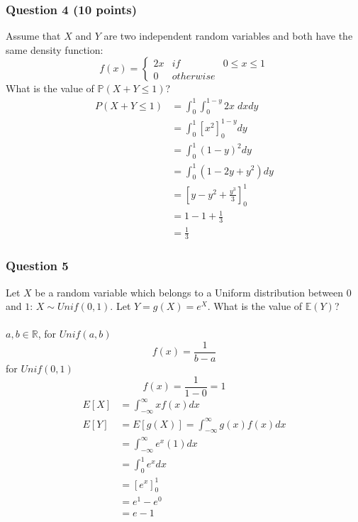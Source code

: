 \documentclass[12pt, border = 4pt, multi]{article} %
\begin{document}
\subsubsection*{Question 4 (10 points)}
Assume that $X$ and $Y$ are two 
independent random variables and 
both have the same density function: 
\begin{equation}
    f(x) =
    \left\{ \begin{array}{cll}
    2x & if & 0 \le x \le 1 \\ 
    0  & otherwise & 
\end{array} \right.
\end{equation}
What is the value of 
$\mathbb{P}(X + Y \le 1)$?
\\
\begin{align*}
P(X + Y \le 1) &= \int_0 ^ 1 \int_0 ^ {1 - y} 2x\;dx dy\\
&= \int_0 ^ 1 [x ^ 2]_0 ^ {1 - y} dy\\
&= \int_0 ^ 1 (1 - y) ^ 2 dy\\
&= \int_0 ^ 1 (1 - 2y + y ^ 2) dy\\
&= \left[y - y ^ 2 + \frac{y ^ 3}{3}\right]_0 ^ 1\\
&= 1 - 1 + \frac{1}{3}\\
&= \boxed{\frac{1}{3}}
\end{align*}
\newpage
\noindent
\subsubsection*{Question 5}
Let $X$ be a random variable which belongs 
to a Uniform distribution between 
$0$ and $1$: $X \sim Unif(0,1)$. Let 
$Y = g(X) = e^{X}$. What is the value 
of $\mathbb{E}(Y)$?\\
\\
$a, b \in \mathbb{R}$, for $Unif(a, b)$
\[f(x) = \frac{1}{b - a}\]
for $Unif(0, 1)$
\[f(x) = \frac{1}{1 - 0} = 1\]
\begin{align*}
E[X] &= \int_{-\infty} ^ {\infty} x f(x) dx\\
E[Y] &= E[g(X)] = \int_{-\infty} ^ {\infty} g(x) f(x) dx\\
&= \int_{-\infty} ^ {\infty} e ^ x (1) dx\\
&= \int_0 ^ 1 e ^ x dx\\
&= [e ^ x]_0 ^ 1\\
&= e ^ 1 - e ^ 0\\
&= \boxed{e - 1}\\
\end{align*}
\newpage
\noindent
\end{document}
